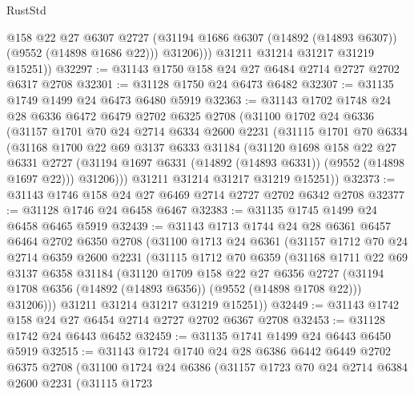 \begin{lexlean}{RustStd}
\begin{coremodule}
              @158
              @22
              @27
              @6307
              @2727
              (@31194 @1686 @6307 (@14892 (@14893 @6307)) (@9552 (@14898 @1686 @22)))
              @31206)))
        @31211
        @31214
        @31217
        @31219
        @15251))
@32297 := @31143 @1750 @158 @24 @27 @6484 @2714 @2727 @2702 @6317 @2708
@32301 := @31128 @1750 @24 @6473 @6482
@32307 := @31135 @1749 @1499 @24 @6473 @6480 @5919
@32363 := @31143
    @1702
    @1748
    @24
    @28
    @6336
    @6472
    @6479
    @2702
    @6325
    @2708
    (@31100
      @1702
      @24
      @6336
      (@31157
        @1701
        @70
        @24
        @2714
        @6334
        @2600
        @2231
        (@31115
          @1701
          @70
          @6334
          (@31168
            @1700
            @22
            @69
            @3137
            @6333
            @31184
            (@31120
              @1698
              @158
              @22
              @27
              @6331
              @2727
              (@31194 @1697 @6331 (@14892 (@14893 @6331)) (@9552 (@14898 @1697 @22)))
              @31206)))
        @31211
        @31214
        @31217
        @31219
        @15251))
@32373 := @31143 @1746 @158 @24 @27 @6469 @2714 @2727 @2702 @6342 @2708
@32377 := @31128 @1746 @24 @6458 @6467
@32383 := @31135 @1745 @1499 @24 @6458 @6465 @5919
@32439 := @31143
    @1713
    @1744
    @24
    @28
    @6361
    @6457
    @6464
    @2702
    @6350
    @2708
    (@31100
      @1713
      @24
      @6361
      (@31157
        @1712
        @70
        @24
        @2714
        @6359
        @2600
        @2231
        (@31115
          @1712
          @70
          @6359
          (@31168
            @1711
            @22
            @69
            @3137
            @6358
            @31184
            (@31120
              @1709
              @158
              @22
              @27
              @6356
              @2727
              (@31194 @1708 @6356 (@14892 (@14893 @6356)) (@9552 (@14898 @1708 @22)))
              @31206)))
        @31211
        @31214
        @31217
        @31219
        @15251))
@32449 := @31143 @1742 @158 @24 @27 @6454 @2714 @2727 @2702 @6367 @2708
@32453 := @31128 @1742 @24 @6443 @6452
@32459 := @31135 @1741 @1499 @24 @6443 @6450 @5919
@32515 := @31143
    @1724
    @1740
    @24
    @28
    @6386
    @6442
    @6449
    @2702
    @6375
    @2708
    (@31100
      @1724
      @24
      @6386
      (@31157
        @1723
        @70
        @24
        @2714
        @6384
        @2600
        @2231
        (@31115
          @1723

\end{coremodule}
\end{lexlean}
